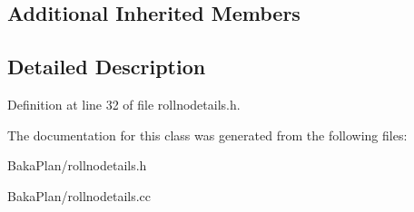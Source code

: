 \subsection*{Additional Inherited Members}


\subsection{Detailed Description}


Definition at line 32 of file rollnodetails.\-h.



The documentation for this class was generated from the following files\-:\begin{DoxyCompactItemize}
\item 
Baka\-Plan/rollnodetails.\-h\item 
Baka\-Plan/rollnodetails.\-cc\end{DoxyCompactItemize}
